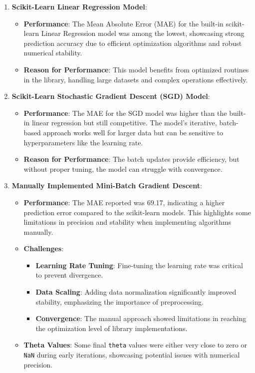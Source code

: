 \documentclass[11pt]{article}
\providecommand{\tightlist}{%
      \setlength{\itemsep}{0pt}\setlength{\parskip}{0pt}}
\begin{document}
\begin{enumerate}
\def\labelenumi{\arabic{enumi}.}
\tightlist
\item
  \textbf{Scikit-Learn Linear Regression Model}:

  \begin{itemize}
  \tightlist
  \item
    \textbf{Performance}: The Mean Absolute Error (MAE) for the built-in
    scikit-learn Linear Regression model was among the lowest,
    showcasing strong prediction accuracy due to efficient optimization
    algorithms and robust numerical stability.
  \item
    \textbf{Reason for Performance}: This model benefits from optimized
    routines in the library, handling large datasets and complex
    operations effectively.
  \end{itemize}
\item
  \textbf{Scikit-Learn Stochastic Gradient Descent (SGD) Model}:

  \begin{itemize}
  \tightlist
  \item
    \textbf{Performance}: The MAE for the SGD model was higher than the
    built-in linear regression but still competitive. The model's
    iterative, batch-based approach works well for larger data but can
    be sensitive to hyperparameters like the learning rate.
  \item
    \textbf{Reason for Performance}: The batch updates provide
    efficiency, but without proper tuning, the model can struggle with
    convergence.
  \end{itemize}
\item
  \textbf{Manually Implemented Mini-Batch Gradient Descent}:

  \begin{itemize}
  \tightlist
  \item
    \textbf{Performance}: The MAE reported was 69.17, indicating a
    higher prediction error compared to the scikit-learn models. This
    highlights some limitations in precision and stability when
    implementing algorithms manually.
  \item
    \textbf{Challenges}:

    \begin{itemize}
    \tightlist
    \item
      \textbf{Learning Rate Tuning}: Fine-tuning the learning rate was
      critical to prevent divergence.
    \item
      \textbf{Data Scaling}: Adding data normalization significantly
      improved stability, emphasizing the importance of preprocessing.
    \item
      \textbf{Convergence}: The manual approach showed limitations in
      reaching the optimization level of library implementations.
    \end{itemize}
  \item
    \textbf{Theta Values}: Some final \texttt{theta} values were either
    very close to zero or \texttt{NaN} during early iterations,
    showcasing potential issues with numerical precision.
  \end{itemize}
\end{enumerate}
\end{document}
